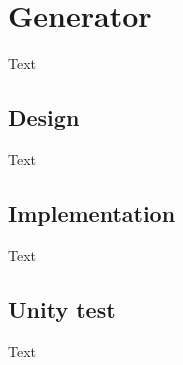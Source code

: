 \section{Generator}
Text

\subsection{Design}
Text

\subsection{Implementation}
Text

\subsection{Unity test}
Text